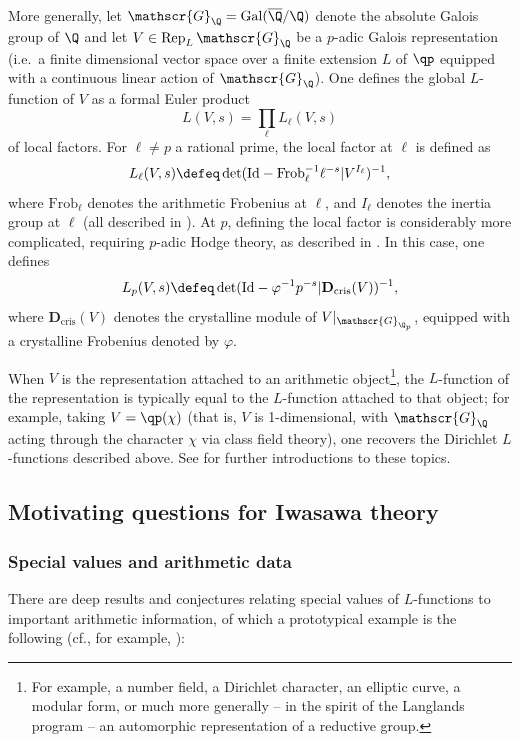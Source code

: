\documentclass[a4paper,10pt, english, reqno]{smfart}
\numberwithin{equation}{section}
\begin{document}
\begin{remark}
More generally, let $\mathscr{G}_{\Q} = \mathrm{Gal}(\overline{\Q} / \Q)$ denote the absolute Galois group of $\Q$ and let $V \in \mathrm{Rep}_L \, \mathscr{G}_{\Q}$ be a $p$-adic Galois representation (i.e.\ a finite dimensional vector space over a finite extension $L$ of $\qp$ equipped with a continuous linear action of $\mathscr{G}_{\Q}$). One defines the global $L$-function of $V$ as a formal Euler product
	\[ 
	L(V, s) = \prod_{\ell} L_\ell(V, s)
	\] 
 of local factors. For $\ell \neq p$ a rational prime, the local factor at $\ell$ is defined as
	\[ 
	L_\ell(V, s) \defeq \det(\mathrm{Id} - \mathrm{Frob}_\ell^{-1} \ell^{-s} | V^{I_\ell})^{-1}, 
	\]
	where $\mathrm{Frob}_\ell$ denotes the arithmetic Frobenius at $\ell$, and $I_\ell$ denotes the inertia group at $\ell$ (all described in \cite[\S I]{Serre89}). At $p$, defining the local factor is considerably more complicated, requiring $p$-adic Hodge theory, as described in \cite{Ber02,Ben22}. In this case, one defines 
	\[ 
	L_p(V, s) \defeq \det(\mathrm{Id} - \varphi^{-1} p^{-s} | \mathbf{D}_{\mathrm{cris}}(V))^{-1},
	\]
	where $\mathbf{D}_{\mathrm{cris}}(V)$ denotes the crystalline module of $V|_{\mathscr{G}_{\Q_p}}$, equipped with a crystalline Frobenius denoted by $\varphi$. 
 
	When $V$ is the representation attached to an arithmetic object\footnote{For example, a number field, a Dirichlet character, an elliptic curve, a modular form, or much more generally -- in the spirit of the Langlands program -- an automorphic representation of a reductive group.}, the $L$-function of the representation is typically equal to the $L$-function attached to that object; for example, taking $V = \qp(\chi)$ (that is, $V$ is 1-dimensional, with $\mathscr{G}_{\Q}$ acting through the character $\chi$ via class field theory), one recovers the Dirichlet $L$-functions described above. See  \cite{Bel09} for further introductions to these topics.
\end{remark}


\subsection{Motivating questions for Iwasawa theory}

\subsubsection{Special values and arithmetic data}
There are deep results and conjectures relating special values of $L$-functions to important arithmetic information, of which a prototypical example is the following (cf., for example, \cite[\S 5]{NeuirchANT}):
\end{document}
